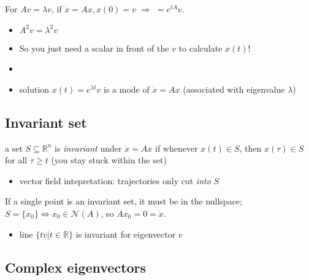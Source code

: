 \documentclass[10pt,letterpaper]{article}
\begin{document}
For $Av=\lambda v$, if $\dot x= Ax,x(0)=v$ $\Rightarrow$  $= e ^{tA} v$.
\begin{itemize}
\item $A ^{2} v = \lambda ^{2} v$
\item So you just need a scalar in front of the $v$ to calculate $x(t)!$
\item {}
\item solution $x(t) = e ^{\lambda t} v$ is a mode of $\dot x=Ax$ (associated with eigenvalue $\lambda$)
\end{itemize}
\subsection{Invariant set}
\label{sec-10_5}

a set $S \subseteq \mathbb{R}^{n}$ is \emph{invariant} under $\dot x = Ax$ if whenever $x(t) \in S$, then $x(\tau) \in S$ for all $\tau \ge t$ (you stay stuck within the set)
\begin{itemize}
\item vector field intepretation: trajectories only cut \emph{into} $S$
\end{itemize}
If a single point is an invariant set, it must be in the nullspace; $S=\{x_0\} \Leftrightarrow x_0 \in \mathcal{N}(A)$, so $Ax_0=0=\dot x$.
\begin{itemize}
\item line $\{tv | t \in \mathbb{R}\}$ is invariant for eigenvector $v$
\end{itemize}
\subsection{Complex eigenvectors}
\label{sec-10_6}
\end{document}
